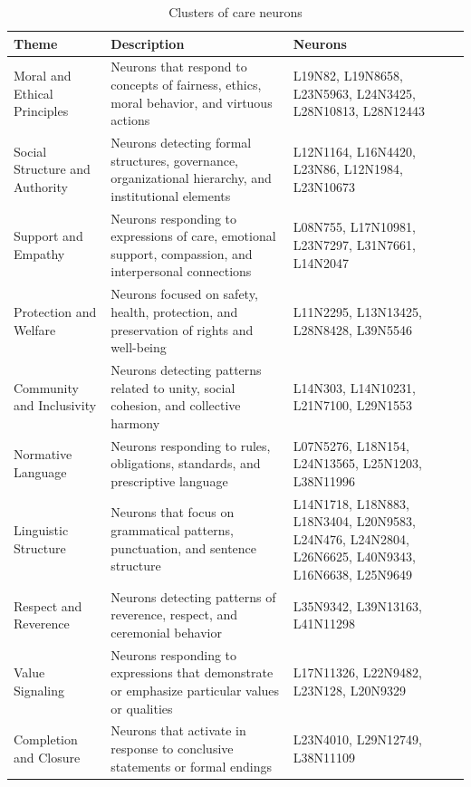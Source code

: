 \documentclass[runninghheads]{llncs}
\begin{document}
\begin{table}[!tb]
    \centering
    \begin{tabular}{|p{3cm}|p{5.5cm}|p{3.5cm}|}
    \hline
        \textbf{Theme} & \textbf{Description} & \textbf{Neurons} \\ \hline
        Moral and Ethical Principles & Neurons that respond to concepts of fairness, ethics, moral behavior, and virtuous actions & L19N82, L19N8658, L23N5963, L24N3425, L28N10813, L28N12443 \\ \hline
        Social Structure and Authority & Neurons detecting formal structures, governance, organizational hierarchy, and institutional elements & L12N1164, L16N4420, L23N86, L12N1984, L23N10673 \\ \hline
        Support and Empathy & Neurons responding to expressions of care, emotional support, compassion, and interpersonal connections & L08N755, L17N10981, L23N7297, L31N7661, L14N2047 \\ \hline
        Protection and Welfare & Neurons focused on safety, health, protection, and preservation of rights and well-being & L11N2295, L13N13425, L28N8428, L39N5546 \\ \hline
        Community and Inclusivity & Neurons detecting patterns related to unity, social cohesion, and collective harmony & L14N303, L14N10231, L21N7100, L29N1553 \\ \hline
        Normative Language & Neurons responding to rules, obligations, standards, and prescriptive language & L07N5276, L18N154, L24N13565, L25N1203, L38N11996 \\ \hline
        Linguistic Structure & Neurons that focus on grammatical patterns, punctuation, and sentence structure & L14N1718, L18N883, L18N3404, L20N9583, L24N476, L24N2804, L26N6625, L40N9343, L16N6638, L25N9649 \\ \hline
        Respect and Reverence & Neurons detecting patterns of reverence, respect, and ceremonial behavior & L35N9342, L39N13163, L41N11298 \\ \hline
        Value Signaling & Neurons responding to expressions that demonstrate or emphasize particular values or qualities & L17N11326, L22N9482, L23N128, L20N9329 \\ \hline
        Completion and Closure & Neurons that activate in response to conclusive statements or formal endings & L23N4010, L29N12749, L38N11109 \\ \hline
    \end{tabular}
     \caption{Clusters of care neurons}
    \label{tab:care}
\end{table}
\end{document}
